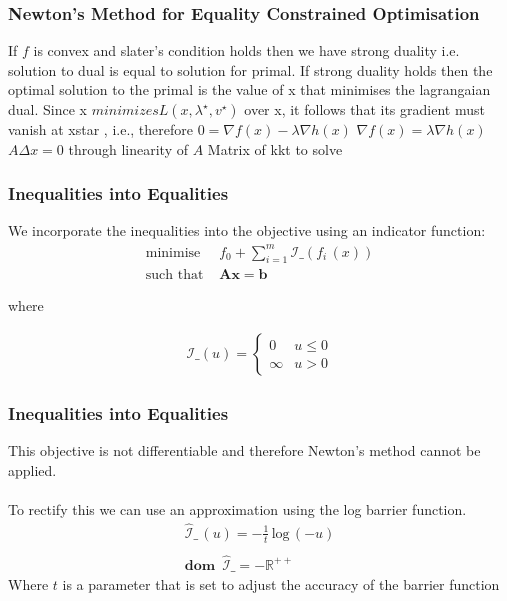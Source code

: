 \documentclass{beamer}
\def\rnum{\mathbb{R}}
\begin{document}
\begin{frame}
    \frametitle{Newton's Method for Equality Constrained Optimisation}
    If $f$ is convex and slater's condition holds then we have strong duality
    i.e. solution to dual is equal to solution for primal. If strong duality
    holds then the optimal solution to the primal is the value of x that
    minimises the lagrangaian dual.  Since x
    $ minimizes L(x, \lambda^{\star} , v^{\star} )$ over x, it follows that its gradient
       must vanish at xstar , i.e.,
       therefore $0 = \nabla f(x) - \lambda \nabla h(x)$
       $\nabla f(x) = \lambda \nabla h(x)$
       $A \Delta x = 0$ through linearity of $A$
       Matrix of kkt to solve
   \end{frame}

\begin{frame}
    \frametitle{Inequalities into Equalities}
    We incorporate the inequalities into the objective using an indicator
    function:
    \begin{align*}
        \text{minimise } \, &f_{0} +
        \sum_{i=1}^{m}\mathcal{I}\_\left(f_{i}\,(x)\right )\\
        \text{such that } & \mathbf{A}\mathbf{x} =\mathbf{b}
    \end{align*}

where

\begin{align*}
    \mathcal{I}\_(u) =
    \begin{cases}
        0 &u \leq 0 \\
        \infty &u > 0
    \end{cases}
\end{align*}
\end{frame}

\begin{frame}
    \frametitle{Inequalities into Equalities}
    This objective is not differentiable and therefore Newton's method cannot be
    applied.
    \\~\\
    To rectify this we can use an approximation using the log barrier function.
    \begin{align*}
        \hat{\mathcal{I}}\_\, (u) = -\frac{1}{t}\, \text{log}\,(-u) \\\\
        \mathbf{dom} \,\,\,\hat{\mathcal{I}}\_ = -\rnum^{++}
    \end{align*}
    Where $t$ is a parameter that is set to adjust the accuracy of the barrier
    function
\end{frame}
\end{document}
